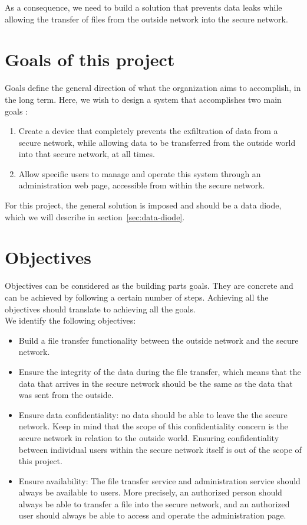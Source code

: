 \documentclass[a4paper,11pt]{article}
\begin{document}
As a consequence, we need to build a solution that prevents data leaks while allowing the transfer of files from the outside network into the secure network.

\section{Goals of this project}
\label{sec:goals}
Goals define the general direction of what the organization aims to accomplish, in the long term. Here, we wish to design a system that accomplishes two main goals :

\begin{enumerate}
\item{Create a device that completely prevents the exfiltration of data from a secure network, while allowing data to be transferred from the outside world into that secure network, at all times.}
\item{Allow specific users to manage and operate this system through an administration web page, accessible from within the secure network.}
\end{enumerate}

For this project, the general solution is imposed and should be a data diode, which we will describe in section~\ref{sec:data-diode}.


\section{Objectives}
\label{sec:objectives}
Objectives can be considered as the building parts goals. They are concrete and can be achieved by following a certain number of steps. Achieving all the objectives should translate to achieving all the goals.\\

We identify the following objectives:
\begin{itemize}
\item{Build a file transfer functionality between the outside network and the secure network.}
\item{Ensure the integrity of the data during the file transfer, which means that the data that arrives in the secure network should be the same as the data that was sent from the outside.}
\item{Ensure data confidentiality: no data should be able to leave the the secure network. Keep in mind that the scope of this confidentiality concern is the secure network in relation to the outside world. Ensuring confidentiality between individual users within the secure network itself is out of the scope of this project.}
\item{Ensure availability: The file transfer service and administration service should always be available to users. More precisely, an authorized person should always be able to transfer a file into the secure network, and an authorized user should always be able to access and operate the administration page.}
\end{itemize}
\end{document}
